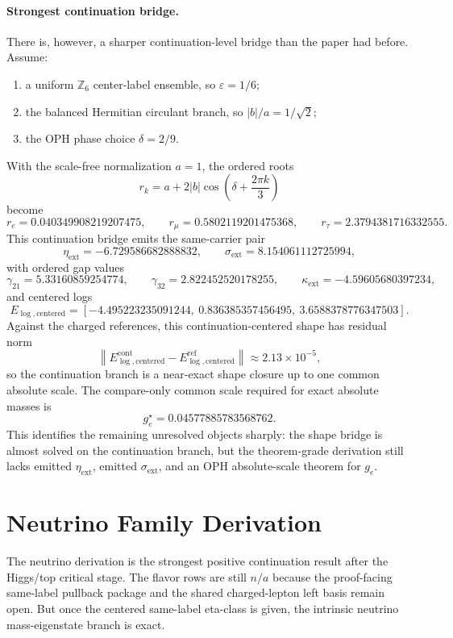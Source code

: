 \documentclass[11pt]{article}
\begin{document}
\paragraph{Strongest continuation bridge.}
There is, however, a sharper continuation-level bridge than the paper had before.  Assume:
\begin{enumerate}[leftmargin=2em]
\item a uniform \(\mathbb Z_6\) center-label ensemble, so \(\varepsilon = 1/6\);
\item the balanced Hermitian circulant branch, so \(|b|/a = 1/\sqrt2\);
\item the OPH phase choice \(\delta = 2/9\).
\end{enumerate}
With the scale-free normalization \(a=1\), the ordered roots
\[
r_k = a + 2|b|\cos\!\left(\delta + \frac{2\pi k}{3}\right)
\]
become
\[
r_e = 0.040349908219207475,
\qquad
r_\mu = 0.5802119201475368,
\qquad
r_\tau = 2.3794381716332555.
\]
This continuation bridge emits the same-carrier pair
\[
\eta_{\mathrm{ext}} = -6.729586682888832,
\qquad
\sigma_{\mathrm{ext}} = 8.154061112725994,
\]
with ordered gap values
\[
\gamma_{21}=5.33160859254774,
\qquad
\gamma_{32}=2.822452520178255,
\qquad
\kappa_{\mathrm{ext}}=-4.59605680397234,
\]
and centered logs
\[
E_{\log,\mathrm{centered}}
=
[-4.495223235091244,\ 0.836385357456495,\ 3.6588378776347503].
\]
Against the charged references, this continuation-centered shape has residual norm
\[
\left\|E_{\log,\mathrm{centered}}^{\mathrm{cont}}
-E_{\log,\mathrm{centered}}^{\mathrm{ref}}\right\|
\approx
2.13\times10^{-5},
\]
so the continuation branch is a near-exact shape closure up to one common absolute
scale. The compare-only common scale required for exact absolute masses is
\[
g_e^\star = 0.04577885783568762.
\]
This identifies the remaining unresolved objects sharply: the shape bridge is almost solved on
the continuation branch, but the theorem-grade derivation still lacks emitted
\(\eta_{\mathrm{ext}}\), emitted \(\sigma_{\mathrm{ext}}\), and an OPH absolute-scale theorem
for \(g_e\).

\section{Neutrino Family Derivation}

The neutrino derivation is the strongest positive continuation result after the Higgs/top critical stage.
The flavor rows are still \(n/a\) because the proof-facing same-label pullback package and
the shared charged-lepton left basis remain open. But once the centered same-label eta-class is
given, the intrinsic neutrino mass-eigenstate branch is exact.
\end{document}
